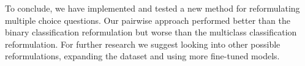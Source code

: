 To conclude, we have implemented and tested a new method for reformulating multiple choice questions.
Our pairwise approach performed better than the binary classification reformulation but worse than the multiclass classification reformulation.
For further research we suggest looking into other possible reformulations, expanding the dataset and using more fine-tuned models.